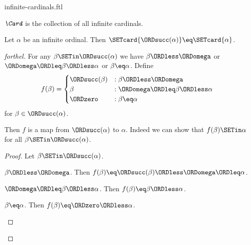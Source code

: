 \documentclass{stex}
\begin{document}
\begin{smodule}{infinite-cardinals.ftl}

\begin{definition}[forthel,id=SET_THEORY_07_4231078585827328]
  $\emph{\Card}$ is the collection of all infinite cardinals.
\end{definition}

\begin{proposition}[forthel,id=SET_THEORY_07_8189062544359424]
  Let $\alpha$ be an infinite ordinal.
  Then $\SETcard{\ORDsucc(\alpha)} \eq \SETcard{\alpha}$.
\end{proposition}
\begin{proof}[forthel]
  For any $\beta \SETin \ORDsucc(\alpha)$ we have
  $\beta \ORDless \ORDomega$ or $\ORDomega \ORDleq \beta \ORDless \alpha$ or $\beta \eq \alpha$.
  Define \[ f(\beta) =
    \begin{cases}
      \ORDsucc(\beta)  & : \beta \ORDless \ORDomega
      \\
      \beta         & : \ORDomega \ORDleq \beta \ORDless \alpha
      \\
      \ORDzero             & : \beta \eq \alpha
    \end{cases} \]
  for $\beta \in \ORDsucc(\alpha)$.

  Then $f$ is a map from $\ORDsucc(\alpha)$ to $\alpha$.
  Indeed we can show that $f(\beta) \SETin \alpha$ for all
  $\beta \SETin \ORDsucc(\alpha)$.
  \begin{proof}
    Let $\beta \SETin \ORDsucc(\alpha)$.

    \begin{case}{$\beta \ORDless \ORDomega$.}
      Then $f(\beta)
        \eq \ORDsucc(\beta)
        \ORDless \ORDomega
        \ORDleq \alpha$.
    \end{case}

    \begin{case}{$\ORDomega \ORDleq \beta \ORDless \alpha$.}
      Then $f(\beta)
        \eq \beta
        \ORDless \alpha$.
    \end{case}

    \begin{case}{$\beta \eq \alpha$.}
      Then $f(\beta)
        \eq \ORDzero
        \ORDless \alpha$.
    \end{case}
  \end{proof}


\end{proof}
\end{smodule}
\end{document}
